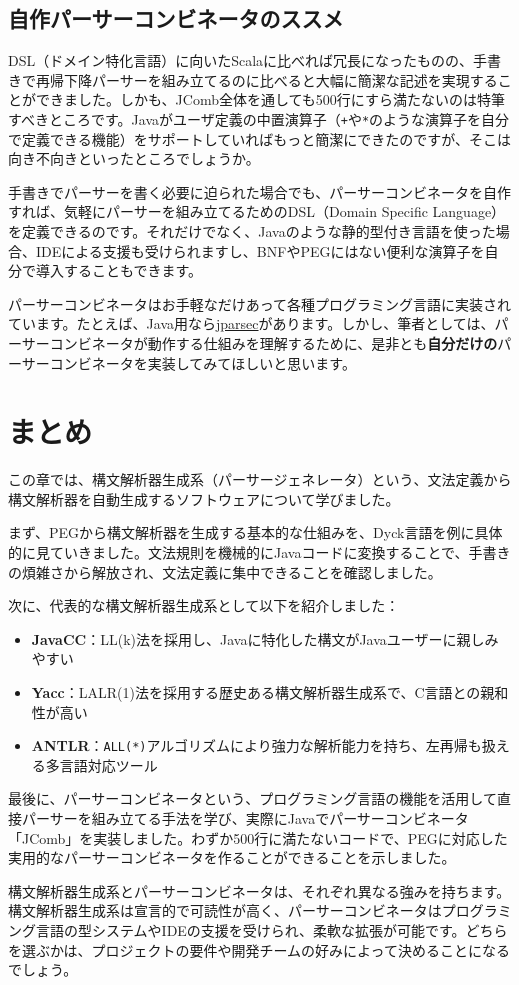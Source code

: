 \hypertarget{chapter6-ux81eaux4f5cux30d1ux30fcux30b5ux30fcux30b3ux30f3ux30d3ux30cdux30fcux30bfux306eux30b9ux30b9ux30e1}{%
\subsection{自作パーサーコンビネータのススメ}\label{chapter6-ux81eaux4f5cux30d1ux30fcux30b5ux30fcux30b3ux30f3ux30d3ux30cdux30fcux30bfux306eux30b9ux30b9ux30e1}}

DSL（ドメイン特化言語）に向いたScalaに比べれば冗長になったものの、手書きで再帰下降パーサーを組み立てるのに比べると大幅に簡潔な記述を実現することができました。しかも、JComb全体を通しても500行にすら満たないのは特筆すべきところです。Javaがユーザ定義の中置演算子（\texttt{+}や\texttt{*}のような演算子を自分で定義できる機能）をサポートしていればもっと簡潔にできたのですが、そこは向き不向きといったところでしょうか。

手書きでパーサーを書く必要に迫られた場合でも、パーサーコンビネータを自作すれば、気軽にパーサーを組み立てるためのDSL（Domain Specific Language）を定義できるのです。それだけでなく、Javaのような静的型付き言語を使った場合、IDEによる支援も受けられますし、BNFやPEGにはない便利な演算子を自分で導入することもできます。

パーサーコンビネータはお手軽なだけあって各種プログラミング言語に実装されています。たとえば、Java用なら\href{https://github.com/jparsec/jparsec}{jparsec}があります。しかし、筆者としては、パーサーコンビネータが動作する仕組みを理解するために、是非とも\textbf{自分だけの}パーサーコンビネータを実装してみてほしいと思います。

\hypertarget{chapter6-ux307eux3068ux3081}{%
\section{まとめ}\label{chapter6-ux307eux3068ux3081}}

この章では、構文解析器生成系（パーサージェネレータ）という、文法定義から構文解析器を自動生成するソフトウェアについて学びました。

まず、PEGから構文解析器を生成する基本的な仕組みを、Dyck言語を例に具体的に見ていきました。文法規則を機械的にJavaコードに変換することで、手書きの煩雑さから解放され、文法定義に集中できることを確認しました。

次に、代表的な構文解析器生成系として以下を紹介しました：

\begin{itemize}
\tightlist
\item
  \textbf{JavaCC}：LL(k)法を採用し、Javaに特化した構文がJavaユーザーに親しみやすい
\item
  \textbf{Yacc}：LALR(1)法を採用する歴史ある構文解析器生成系で、C言語との親和性が高い
\item
  \textbf{ANTLR}：\texttt{ALL(*)}アルゴリズムにより強力な解析能力を持ち、左再帰も扱える多言語対応ツール
\end{itemize}

最後に、パーサーコンビネータという、プログラミング言語の機能を活用して直接パーサーを組み立てる手法を学び、実際にJavaでパーサーコンビネータ「JComb」を実装しました。わずか500行に満たないコードで、PEGに対応した実用的なパーサーコンビネータを作ることができることを示しました。

構文解析器生成系とパーサーコンビネータは、それぞれ異なる強みを持ちます。構文解析器生成系は宣言的で可読性が高く、パーサーコンビネータはプログラミング言語の型システムやIDEの支援を受けられ、柔軟な拡張が可能です。どちらを選ぶかは、プロジェクトの要件や開発チームの好みによって決めることになるでしょう。
